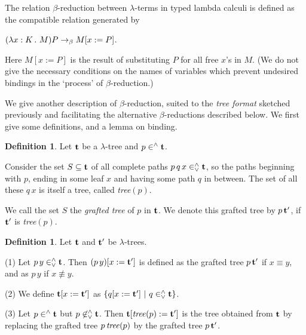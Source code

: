 \documentclass{article}
\theoremstyle{plain}
\theoremstyle{definition}
\newtheorem{Def}[The]{Definition}
\begin{document}
The relation $\beta$-reduction between $\lambda$-terms in typed lambda calculi is defined as the compatible relation generated by

\smallskip

$(\lambda x : K \, . \,\, M)P \rightarrow_{\beta} M[x := P]$.

\smallskip

Here $M [x := P]$ is the result of substituting $P$ for all free $x$'s in $M$. (We do not give the necessary conditions on the names of variables which prevent undesired bindings in the `process' of $\beta$-reduction.)

\smallskip

We give another description of $\beta$-reduction, suited to the {\em tree format\/} sketched previously and facilitating the alternative $\beta$-reductions described below. We first give some definitions, and a lemma on binding.

\begin{Def}\label{DefGraTre}
Let ${\bf t}$ be a $\lambda$-tree and $p \in^\wedge {\bf t}$.

Consider the set $S \subseteq {\bf t}$ of all complete paths $p \, q \, x \in^\wedge_\vee{\bf t}$, so the paths beginning with $p$, ending in some leaf $x$ and having some path $q$ in between. The set of all these $q \, x$ is itself a tree, called {\it tree}$(p)$.



We call the set $S$ the {\em grafted tree\/} of $p$ in ${\bf t}$.
We denote this grafted tree by $p \, {\bf t}'$, if ${\bf t}'$ is {\it tree}$(p)$.



\end{Def}

\begin{Def}\label{DefSubTre}
Let ${\bf t}$ and ${\bf t}'$ be $\lambda$-trees.

(1) Let $p \, y \in^{\wedge}_{\vee} {\bf t}$.
Then $(p \, y)[x := {\bf t}']$ is defined as the grafted tree $p \, {\bf t}'$ if $x \equiv y$, and as $p \, y$ if $x \not\equiv y$.

(2) We define ${\bf t} [x := {\bf t}']$ as $\{q [x := {\bf t}'] ~|~ q \in^\wedge_\vee {\bf t} \}$.

(3) Let $p \in^\wedge {\bf t}$ but $p \not\in^\wedge_\vee {\bf t}$. Then ${\bf t} [{\it tree}(p) := {\bf t}']$ is the tree obtained from ${\bf t}$ by replacing the grafted tree $p \, {\it tree}(p)$ by the grafted tree $p \, {\bf t}'$.
\end{Def}
\end{document}
